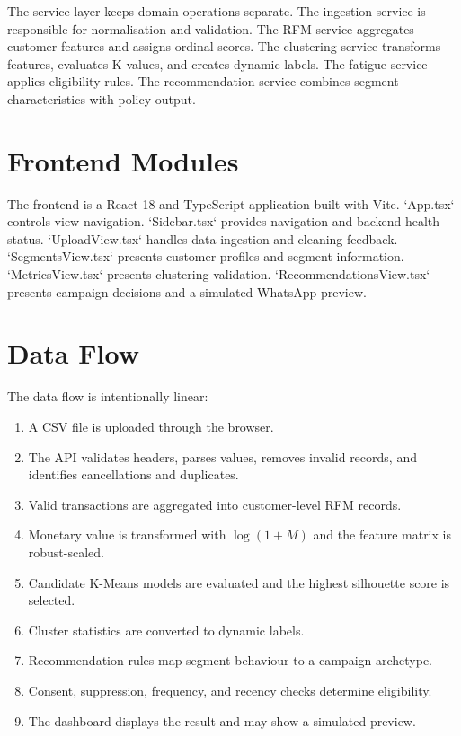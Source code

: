 \documentclass[12pt,a4paper]{report}
\begin{document}
The service layer keeps domain operations separate. The ingestion service is responsible for normalisation and validation. The RFM service aggregates customer features and assigns ordinal scores. The clustering service transforms features, evaluates K values, and creates dynamic labels. The fatigue service applies eligibility rules. The recommendation service combines segment characteristics with policy output.

\section{Frontend Modules}
The frontend is a React 18 and TypeScript application built with Vite. `App.tsx` controls view navigation. `Sidebar.tsx` provides navigation and backend health status. `UploadView.tsx` handles data ingestion and cleaning feedback. `SegmentsView.tsx` presents customer profiles and segment information. `MetricsView.tsx` presents clustering validation. `RecommendationsView.tsx` presents campaign decisions and a simulated WhatsApp preview.

\section{Data Flow}
The data flow is intentionally linear:
\begin{enumerate}
\item A CSV file is uploaded through the browser.
\item The API validates headers, parses values, removes invalid records, and identifies cancellations and duplicates.
\item Valid transactions are aggregated into customer-level RFM records.
\item Monetary value is transformed with $\log(1+M)$ and the feature matrix is robust-scaled.
\item Candidate K-Means models are evaluated and the highest silhouette score is selected.
\item Cluster statistics are converted to dynamic labels.
\item Recommendation rules map segment behaviour to a campaign archetype.
\item Consent, suppression, frequency, and recency checks determine eligibility.
\item The dashboard displays the result and may show a simulated preview.
\end{enumerate}
\end{document}
